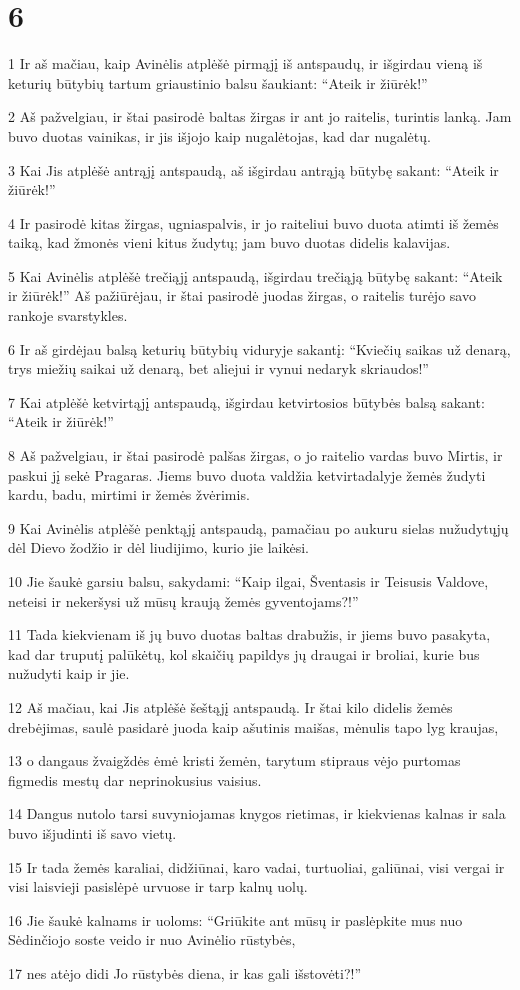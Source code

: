 \chapter{6}


\par 1 Ir aš mačiau, kaip Avinėlis atplėšė pirmąjį iš antspaudų, ir išgirdau vieną iš keturių būtybių tartum griaustinio balsu šaukiant: “Ateik ir žiūrėk!” 
\par 2 Aš pažvelgiau, ir štai pasirodė baltas žirgas ir ant jo raitelis, turintis lanką. Jam buvo duotas vainikas, ir jis išjojo kaip nugalėtojas, kad dar nugalėtų. 
\par 3 Kai Jis atplėšė antrąjį antspaudą, aš išgirdau antrąją būtybę sakant: “Ateik ir žiūrėk!” 
\par 4 Ir pasirodė kitas žirgas, ugniaspalvis, ir jo raiteliui buvo duota atimti iš žemės taiką, kad žmonės vieni kitus žudytų; jam buvo duotas didelis kalavijas. 
\par 5 Kai Avinėlis atplėšė trečiąjį antspaudą, išgirdau trečiąją būtybę sakant: “Ateik ir žiūrėk!” Aš pažiūrėjau, ir štai pasirodė juodas žirgas, o raitelis turėjo savo rankoje svarstykles. 
\par 6 Ir aš girdėjau balsą keturių būtybių viduryje sakantį: “Kviečių saikas už denarą, trys miežių saikai už denarą, bet aliejui ir vynui nedaryk skriaudos!” 
\par 7 Kai atplėšė ketvirtąjį antspaudą, išgirdau ketvirtosios būtybės balsą sakant: “Ateik ir žiūrėk!” 
\par 8 Aš pažvelgiau, ir štai pasirodė palšas žirgas, o jo raitelio vardas buvo Mirtis, ir paskui jį sekė Pragaras. Jiems buvo duota valdžia ketvirtadalyje žemės žudyti kardu, badu, mirtimi ir žemės žvėrimis. 
\par 9 Kai Avinėlis atplėšė penktąjį antspaudą, pamačiau po aukuru sielas nužudytųjų dėl Dievo žodžio ir dėl liudijimo, kurio jie laikėsi. 
\par 10 Jie šaukė garsiu balsu, sakydami: “Kaip ilgai, Šventasis ir Teisusis Valdove, neteisi ir nekeršysi už mūsų kraują žemės gyventojams?!” 
\par 11 Tada kiekvienam iš jų buvo duotas baltas drabužis, ir jiems buvo pasakyta, kad dar truputį palūkėtų, kol skaičių papildys jų draugai ir broliai, kurie bus nužudyti kaip ir jie. 
\par 12 Aš mačiau, kai Jis atplėšė šeštąjį antspaudą. Ir štai kilo didelis žemės drebėjimas, saulė pasidarė juoda kaip ašutinis maišas, mėnulis tapo lyg kraujas, 
\par 13 o dangaus žvaigždės ėmė kristi žemėn, tarytum stipraus vėjo purtomas figmedis mestų dar neprinokusius vaisius. 
\par 14 Dangus nutolo tarsi suvyniojamas knygos rietimas, ir kiekvienas kalnas ir sala buvo išjudinti iš savo vietų. 
\par 15 Ir tada žemės karaliai, didžiūnai, karo vadai, turtuoliai, galiūnai, visi vergai ir visi laisvieji pasislėpė urvuose ir tarp kalnų uolų. 
\par 16 Jie šaukė kalnams ir uoloms: “Griūkite ant mūsų ir paslėpkite mus nuo Sėdinčiojo soste veido ir nuo Avinėlio rūstybės, 
\par 17 nes atėjo didi Jo rūstybės diena, ir kas gali išstovėti?!”


